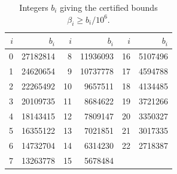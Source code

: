 \begin{table}[htbp]
\centering
\small
\caption{Integers $b_i$ giving the certified bounds $\beta_i\ge b_i/10^6$.}\label{tab:beta}
\begin{tabular}{rr@{\qquad}rr@{\qquad}rr}
\toprule
$i$ & $b_i$ & $i$ & $b_i$ & $i$ & $b_i$ \\
\midrule
0 & 27182814 & 8 & 11936093 & 16 & 5107496 \\
1 & 24620654 & 9 & 10737778 & 17 & 4594788 \\
2 & 22265492 & 10 & 9657511 & 18 & 4134485 \\
3 & 20109735 & 11 & 8684622 & 19 & 3721266 \\
4 & 18143415 & 12 & 7809147 & 20 & 3350327 \\
5 & 16355122 & 13 & 7021851 & 21 & 3017335 \\
6 & 14732704 & 14 & 6314230 & 22 & 2718387 \\
7 & 13263778 & 15 & 5678484 &  &  \\
\bottomrule
\end{tabular}
\end{table}
